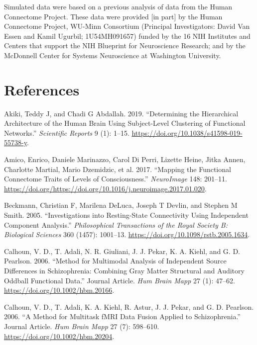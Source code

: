 Simulated data were based on a previous analysis of data from the Human Connectome Project. These data were provided {[}in part{]} by the Human Connectome Project, WU-Minn Consortium (Principal Investigators: David Van Essen and Kamil Ugurbil; 1U54MH091657) funded by the 16 NIH Institutes and Centers that support the NIH Blueprint for Neuroscience Research; and by the McDonnell Center for Systems Neuroscience at Washington University.

\hypertarget{references}{%
\section*{References}\label{references}}

\hypertarget{refs}{}
\begin{CSLReferences}{1}{0}
\leavevmode{}%
Akiki, Teddy J, and Chadi G Abdallah. 2019. {``Determining the Hierarchical Architecture of the Human Brain Using Subject-Level Clustering of Functional Networks.''} \emph{Scientific Reports} 9 (1): 1--15. \url{https://doi.org/10.1038/s41598-019-55738-y}.

\leavevmode{}%
Amico, Enrico, Daniele Marinazzo, Carol Di Perri, Lizette Heine, Jitka Annen, Charlotte Martial, Mario Dzemidzic, et al. 2017. {``Mapping the Functional Connectome Traits of Levels of Consciousness.''} \emph{NeuroImage} 148: 201--11. \url{https://doi.org/https://doi.org/10.1016/j.neuroimage.2017.01.020}.

\leavevmode{}%
Beckmann, Christian F, Marilena DeLuca, Joseph T Devlin, and Stephen M Smith. 2005. {``Investigations into Resting-State Connectivity Using Independent Component Analysis.''} \emph{Philosophical Transactions of the Royal Society B: Biological Sciences} 360 (1457): 1001--13. \url{https://doi.org/10.1098/rstb.2005.1634}.

\leavevmode{}%
Calhoun, V. D., T. Adali, N. R. Giuliani, J. J. Pekar, K. A. Kiehl, and G. D. Pearlson. 2006. {``Method for Multimodal Analysis of Independent Source Differences in Schizophrenia: Combining Gray Matter Structural and Auditory Oddball Functional Data.''} Journal Article. \emph{Hum Brain Mapp} 27 (1): 47--62. \url{https://doi.org/10.1002/hbm.20166}.

\leavevmode{}%
Calhoun, V. D., T. Adali, K. A. Kiehl, R. Astur, J. J. Pekar, and G. D. Pearlson. 2006. {``A Method for Multitask fMRI Data Fusion Applied to Schizophrenia.''} Journal Article. \emph{Hum Brain Mapp} 27 (7): 598--610. \url{https://doi.org/10.1002/hbm.20204}.


\end{CSLReferences}
